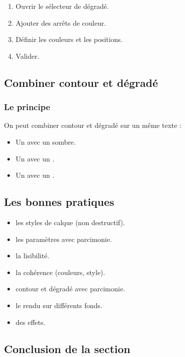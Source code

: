 \begin{enumerate}
    \item Ouvrir le sélecteur de dégradé.
    \item Ajouter des arrêts de couleur.
    \item Définir les couleurs et les positions.
    \item Valider.
\end{enumerate}

\subsection{Combiner contour et dégradé}

\subsubsection{Le principe}

On peut combiner contour et dégradé sur un même texte :

\begin{itemize}
    \item Un  avec un  sombre.
    \item Un  avec un .
    \item Un  avec un .
\end{itemize}

\subsection{Les bonnes pratiques}

\begin{itemize}
    \item {} les styles de calque (non destructif).
    \item {} les paramètres avec parcimonie.
    \item {} la lisibilité.
    \item {} la cohérence (couleurs, style).
    \item {} contour et dégradé avec parcimonie.
    \item {} le rendu sur différents fonds.
    \item {} des effets.
\end{itemize}

\subsection*{Conclusion de la section}


